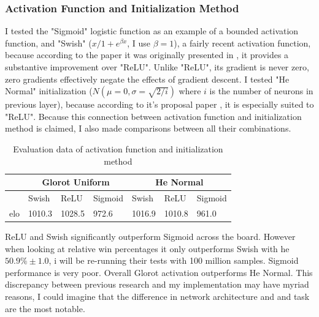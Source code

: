\noindent


\subsubsection{Activation Function and Initialization Method}\label{subsubsec:tr:opt_alg:params:batch}
 I tested the "Sigmoid" logistic function as an example of a bounded activation function, and "Swish" ($x/1+e^{\beta x}$, I use $\beta = 1$),  a fairly recent activation function, because according to the paper it was originally presented in \cite{ramachandran2017searching}, it provides a substantive improvement over "ReLU". Unlike "ReLU", its gradient is never zero, zero gradients effectively negate the effects of gradient descent. I tested "He Normal" initialization ($N(\mu = 0, \sigma = \sqrt{2/i})$ where $i$ is the number of neurons in previous layer), because according to it's proposal paper \cite{He_2015_ICCV}, it is especially suited to "ReLU". Because this connection between activation function and initialization method is claimed, I also made comparisons between all their combinations.

\begin{table}[H]
\begin{center}
\begin{tabular}{ |l|p{1.25cm}|p{1.25cm}|p{1.25cm}||p{1.25cm}|p{1.25cm}|p{1.25cm}|  }
 \hline
 & \multicolumn{3}{c||}{Glorot Uniform} & \multicolumn{3}{c|}{He Normal}\\
 \hline
 \hline
  & Swish & ReLU & Sigmoid & Swish & ReLU & Sigmoid \\
 \hline
 elo & 1010.3 & 1028.5 & 972.6 & 1016.9 & 1010.8 & 961.0 \\
 \hline
\end{tabular}
\end{center}
\caption{Evaluation data of activation function and initialization method}
\label{tab:elo_activation_init}
\end{table}
\noindent
ReLU and Swish significantly outperform Sigmoid across the board. However when looking at relative win percentages it only outperforms Swish with he $50.9\% \pm 1.0$, i will be re-running their tests with 100 million samples. Sigmoid performance is very poor. Overall Glorot activation outperforms He Normal. This discrepancy between previous research and my implementation may have myriad reasons, I could imagine that the difference in network architecture and and task are the most notable. 





